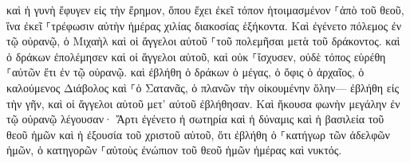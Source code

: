 \documentclass{openreader}
\begin{document}
καὶ ἡ γυνὴ ἔφυγεν εἰς τὴν ἔρημον, ὅπου ἔχει ἐκεῖ τόπον ἡτοιμασμένον ⸀ἀπὸ τοῦ θεοῦ, ἵνα ἐκεῖ ⸀τρέφωσιν αὐτὴν ἡμέρας χιλίας διακοσίας ἑξήκοντα. 
Καὶ ἐγένετο πόλεμος ἐν τῷ οὐρανῷ, ὁ Μιχαὴλ καὶ οἱ ἄγγελοι αὐτοῦ ⸀τοῦ πολεμῆσαι μετὰ τοῦ δράκοντος. καὶ ὁ δράκων ἐπολέμησεν καὶ οἱ ἄγγελοι αὐτοῦ, 
καὶ οὐκ ⸀ἴσχυσεν, οὐδὲ τόπος εὑρέθη ⸀αὐτῶν ἔτι ἐν τῷ οὐρανῷ. 
καὶ ἐβλήθη ὁ δράκων ὁ μέγας, ὁ ὄφις ὁ ἀρχαῖος, ὁ καλούμενος Διάβολος καὶ ⸀ὁ Σατανᾶς, ὁ πλανῶν τὴν οἰκουμένην ὅλην— ἐβλήθη εἰς τὴν γῆν, καὶ οἱ ἄγγελοι αὐτοῦ μετ’ αὐτοῦ ἐβλήθησαν. 
Καὶ ἤκουσα φωνὴν μεγάλην ἐν τῷ οὐρανῷ λέγουσαν· Ἄρτι ἐγένετο ἡ σωτηρία καὶ ἡ δύναμις καὶ ἡ βασιλεία τοῦ θεοῦ ἡμῶν καὶ ἡ ἐξουσία τοῦ χριστοῦ αὐτοῦ, ὅτι ἐβλήθη ὁ ⸀κατήγωρ τῶν ἀδελφῶν ἡμῶν, ὁ κατηγορῶν ⸀αὐτοὺς ἐνώπιον τοῦ θεοῦ ἡμῶν ἡμέρας καὶ νυκτός. 
\end{document}

